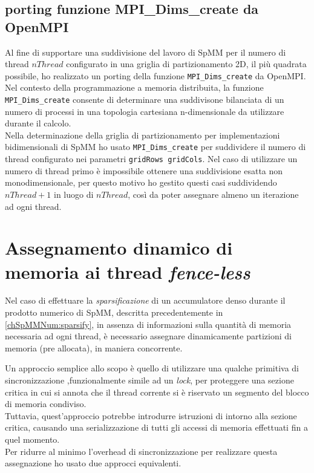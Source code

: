 \subsection{porting funzione MPI\_Dims\_create da OpenMPI}	\label{ompiDimsCreate}
Al fine di supportare una suddivisione del lavoro di SpMM per il numero di thread $nThread$ configurato
in una griglia di partizionamento 2D, il più quadrata possibile, ho realizzato un porting della 
funzione \verb|MPI_Dims_create| da OpenMPI.\\
Nel contesto della programmazione a memoria distribuita, 
la funzione \verb|MPI_Dims_create| consente di determinare una suddivisone bilanciata di un numero di processi in una topologia 
cartesiana n-dimensionale da utilizzare durante il calcolo. \cite{openMPIman}\\
Nella determinazione della griglia di partizionamento per implementazioni bidimensionali di SpMM ho usato 
\verb|MPI_Dims_create| per suddividere il numero di thread configurato nei parametri \verb|gridRows gridCols|.
Nel caso di utilizzare un numero di thread primo è impossibile ottenere una suddivisione esatta non monodimensionale,
per questo motivo ho gestito questi casi suddividendo $nThread+1$ in luogo di $nThread$, 
così da poter assegnare almeno un iterazione ad ogni thread.\\


\section{Assegnamento dinamico di memoria ai thread \emph{fence-less}} \label{chSpMMAux:atomicSegAssign}
Nel caso di effettuare la \emph{sparsificazione} di un accumulatore denso 
durante il prodotto numerico di SpMM, descritta precedentemente in \ref{chSpMMNum:sparsify},
in assenza di informazioni sulla quantità di memoria necessaria ad ogni thread, 
è necessario assegnare dinamicamente partizioni di memoria (pre allocata), in maniera concorrente.\\
\par\null\par
Un approccio semplice allo scopo è quello di utilizzare una qualche primitiva di sincronizzazione
,funzionalmente simile ad un \emph{lock}, per proteggere una sezione critica in cui
si annota che il thread corrente si è riservato un segmento del blocco di memoria condiviso.\\
Tuttavia, quest'approccio potrebbe introdurre istruzioni di  intorno alla sezione critica,
causando una serializzazione di tutti gli accessi di memoria effettuati fin a quel momento.\\
Per ridurre al minimo l'overhead di sincronizzazione per realizzare questa assegnazione
ho usato due approcci equivalenti.

